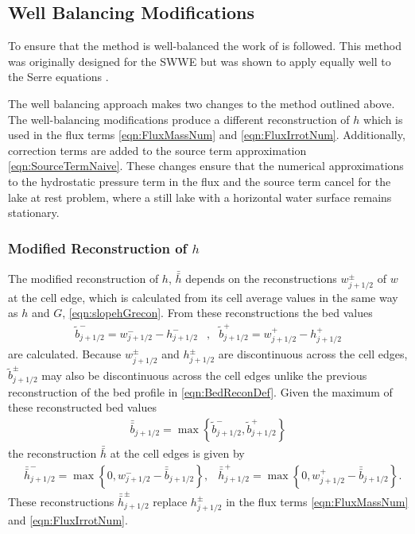 \documentclass[times]{elsarticle}
\begin{document}
\subsection{Well Balancing Modifications}
To ensure that the method is well-balanced the work of \citet{Klein-etal-2004-2050} is followed. This method was originally designed for the SWWE but was shown to apply equally well to the Serre equations \cite{Pitt-J-2014}.

The well balancing approach makes two changes to the method outlined above. The well-balancing modifications produce a different reconstruction of $h$ which is used in the flux terms \eqref{eqn:FluxMassNum} and \eqref{eqn:FluxIrrotNum}. Additionally, correction terms are added to the source term approximation \eqref{eqn:SourceTermNaive}. These changes ensure that the numerical approximations to the hydrostatic pressure term in the flux and the source term cancel for the lake at rest problem, where a still lake with a horizontal water surface remains stationary.

\subsubsection{Modified Reconstruction of $h$}
The modified reconstruction of $h$, $\bar{\bar{h}}$ depends on the reconstructions $w^\pm_{j+1/2}$ of $w$ at the cell edge, which is calculated from its cell average values in the same way as $h$ and $G$, \eqref{eqn:slopehGrecon}. From these reconstructions the bed values
\begin{align*}
\tilde{b}^-_{j+1/2} = w^-_{j+1/2} - h^-_{j+1/2} &, &\tilde{b}^+_{j+1/2} = w^+_{j+1/2} - h^+_{j+1/2}
\end{align*}
are calculated. Because $w^\pm_{j+1/2}$ and $h^\pm_{j+1/2}$ are discontinuous across the cell edges, $\tilde{b}^\pm_{j+1/2}$ may also be discontinuous across the cell edges unlike the previous reconstruction of the bed profile in \eqref{eqn:BedReconDef}. Given the maximum of these reconstructed bed values
\begin{align*}
\bar{\bar{b}}_{j+1/2} = \max\left\lbrace\tilde{b}^-_{j+1/2} , \tilde{b}^+_{j+1/2} \right\rbrace
\end{align*}
the reconstruction $\bar{\bar{h}}$ at the cell edges is given by
\begin{align}
&\bar{\bar{h}}^-_{j+1/2} = \max\left\lbrace 0, w^-_{j+1/2} - \bar{\bar{b}}_{j+1/2}  \right\rbrace, &\bar{\bar{h}}^+_{j+1/2} = \max\left\lbrace 0, w^+_{j+1/2} - \bar{\bar{b}}_{j+1/2} \right\rbrace.
\label{eqn:ModifiedHValue}
\end{align}
These reconstructions $\bar{\bar{h}}^\pm_{j+1/2}$ replace $h^\pm_{j+1/2}$ in the flux terms \eqref{eqn:FluxMassNum} and \eqref{eqn:FluxIrrotNum}.
\end{document}
